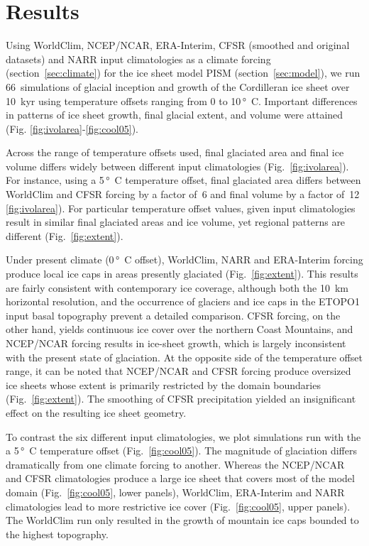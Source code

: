 \section{Results}
\label{sec:results}

Using WorldClim, NCEP/NCAR, ERA-Interim, CFSR (smoothed and original datasets) and NARR input climatologies as a climate forcing (section~\ref{sec:climate}) for the ice sheet model PISM (section~\ref{sec:model}), we run 66~simulations of glacial inception and growth of the Cordilleran ice sheet over 10~kyr using temperature offsets ranging from 0 to 10\,\unit{\degree C}. Important differences in patterns of ice sheet growth, final glacial extent, and volume were attained (Fig. \ref{fig:ivolarea}-\ref{fig:cool05}).

Across the range of temperature offsets used, final glaciated area and final ice volume differs widely between different input climatologies (Fig.~\ref{fig:ivolarea}). For instance, using a 5\,\unit{\degree C} temperature offset, final glaciated area differs between WorldClim and CFSR forcing by a factor of~6 and final volume by a factor of~12 \ref{fig:ivolarea}). For particular temperature offset values, given input climatologies result in similar final glaciated areas and ice volume, yet regional patterns are different (Fig.~\ref{fig:extent}).

Under present climate (0\,\unit{\degree C} offset), WorldClim, NARR and ERA-Interim forcing produce local ice caps in areas presently glaciated (Fig.~\ref{fig:extent}). This results are fairly consistent with contemporary ice coverage, although both the 10~km horizontal resolution, and the occurrence of glaciers and ice caps in the ETOPO1 input basal topography prevent a detailed comparison. CFSR forcing, on the other hand, yields continuous ice cover over the northern Coast Mountains, and NCEP/NCAR forcing results in ice-sheet growth, which is largely inconsistent with the present state of glaciation. At the opposite side of the temperature offset range, it can be noted that NCEP/NCAR and CFSR forcing produce oversized ice sheets whose extent is primarily restricted by the domain boundaries (Fig.~\ref{fig:extent}). The smoothing of CFSR precipitation yielded an insignificant effect on the resulting ice sheet geometry.

To contrast the six different input climatologies, we plot simulations run with the a 5\,\unit{\degree C} temperature offset (Fig.~\ref{fig:cool05}). The magnitude of glaciation differs dramatically from one climate forcing to another. Whereas the NCEP/NCAR and CFSR climatologies produce a large ice sheet that covers most of the model domain (Fig.~\ref{fig:cool05}, lower panels), WorldClim, ERA-Interim and NARR climatologies lead to more restrictive ice cover (Fig.~\ref{fig:cool05}, upper panels). The WorldClim run only resulted in the growth of mountain ice caps bounded to the highest topography.

